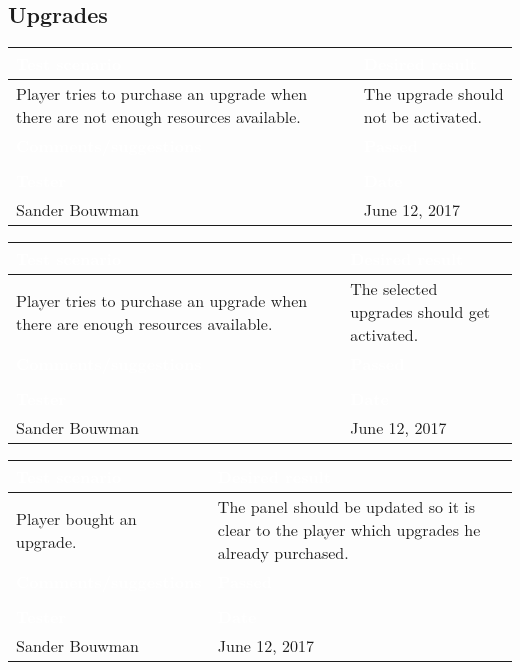 \subsection{Upgrades}

\begin{tabularx}{\textwidth}{|X|X|}
\hline
\rowcolor{lightgray}\textcolor{white}{\textbf{Test scenario}} &
\textcolor{white}{\textbf{Desired result}}       
\\\hline
Player tries to purchase an upgrade when there are not enough resources available. &
The upgrade should not be activated.
\\\hline
\rowcolor{lightgray}\textcolor{white}{\textbf{Comments/suggestions}} & 
\textcolor{white}{\textbf{Passed}}
\\\hline
 & \cellcolor{green}                       
\\\hline
\rowcolor{lightgray}\textcolor{white}{\textbf{Tester}} & 
\textcolor{white}{\textbf{Date}}               
\\\hline
Sander Bouwman & June 12, 2017                               		 
\\\hline
\end{tabularx}

\begin{tabularx}{\textwidth}{|X|X|}
\hline
\rowcolor{lightgray}\textcolor{white}{\textbf{Test scenario}} &
\textcolor{white}{\textbf{Desired result}}       
\\\hline
Player tries to purchase an upgrade when there are enough resources available. &
The selected upgrades should get activated.
\\\hline
\rowcolor{lightgray}\textcolor{white}{\textbf{Comments/suggestions}} & 
\textcolor{white}{\textbf{Passed}}
\\\hline
 & \cellcolor{green}                       
\\\hline
\rowcolor{lightgray}\textcolor{white}{\textbf{Tester}} & 
\textcolor{white}{\textbf{Date}}               
\\\hline
Sander Bouwman & June 12, 2017                               		 
\\\hline
\end{tabularx}

\begin{tabularx}{\textwidth}{|X|X|}
\hline
\rowcolor{lightgray}\textcolor{white}{\textbf{Test scenario}} &
\textcolor{white}{\textbf{Desired result}}       
\\\hline
Player bought an upgrade. &
The panel should be updated so it is clear to the player which upgrades he already purchased.
\\\hline
\rowcolor{lightgray}\textcolor{white}{\textbf{Comments/suggestions}} & 
\textcolor{white}{\textbf{Passed}}
\\\hline
 & \cellcolor{green}                       
\\\hline
\rowcolor{lightgray}\textcolor{white}{\textbf{Tester}} & 
\textcolor{white}{\textbf{Date}}               
\\\hline
Sander Bouwman & June 12, 2017                               		 
\\\hline
\end{tabularx}